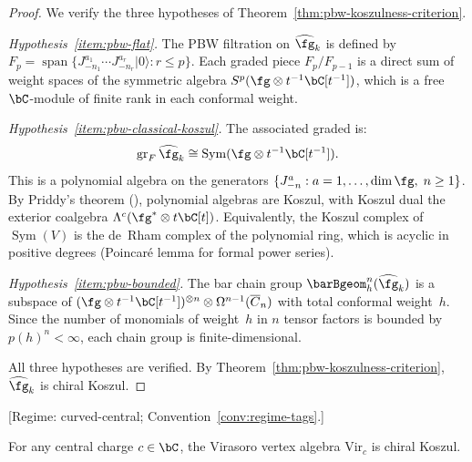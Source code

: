 \begin{proof}
We verify the three hypotheses of
Theorem~\ref{thm:pbw-koszulness-criterion}.

\emph{Hypothesis~\ref{item:pbw-flat}.}
The PBW filtration on $\widehat{\fg}_k$ is defined by
$F_p = \operatorname{span}\{J^{a_1}_{-n_1} \cdots J^{a_r}_{-n_r}
|0\rangle : r \leq p\}$.
Each graded piece $F_p/F_{p-1}$ is a direct sum of
weight spaces of the symmetric algebra
$S^p(\fg \otimes t^{-1}\bC[t^{-1}])$, which is a free
$\bC$-module of finite rank in each conformal weight.

\emph{Hypothesis~\ref{item:pbw-classical-koszul}.}
The associated graded is:
\[
\operatorname{gr}_F \widehat{\fg}_k
\cong \operatorname{Sym}(\fg \otimes t^{-1}\bC[t^{-1}]).
\]
This is a polynomial algebra on the generators
$\{J^a_{-n} : a = 1, \ldots, \dim\fg,\; n \geq 1\}$.
By Priddy's theorem (\cite[Theorem~3.4.5]{LV12}),
polynomial algebras are Koszul, with Koszul dual the
exterior coalgebra $\Lambda^c(\fg^* \otimes t\bC[t])$.
Equivalently, the Koszul complex of $\operatorname{Sym}(V)$
is the de~Rham complex of the polynomial ring, which is
acyclic in positive degrees (Poincar\'{e} lemma for
formal power series).

\emph{Hypothesis~\ref{item:pbw-bounded}.}
The bar chain group $\barBgeom^n_h(\widehat{\fg}_k)$ is a
subspace of $(\fg \otimes t^{-1}\bC[t^{-1}])^{\otimes n}
\otimes \Omega^{n-1}(\overline{C}_n)$ with total conformal
weight~$h$. Since the number of monomials of weight~$h$
in $n$ tensor factors is bounded by $p(h)^n < \infty$,
each chain group is finite-dimensional.

All three hypotheses are verified.
By Theorem~\ref{thm:pbw-koszulness-criterion},
$\widehat{\fg}_k$ is chiral Koszul.
\end{proof}

\begin{theorem}
\label{thm:virasoro-chiral-koszul}
\textup{[Regime: curved-central\textup{;}
Convention~\textup{\ref{conv:regime-tags}}.]}

For any central charge $c \in \bC$, the Virasoro vertex algebra
$\mathrm{Vir}_c$ is chiral Koszul.
\end{theorem}

